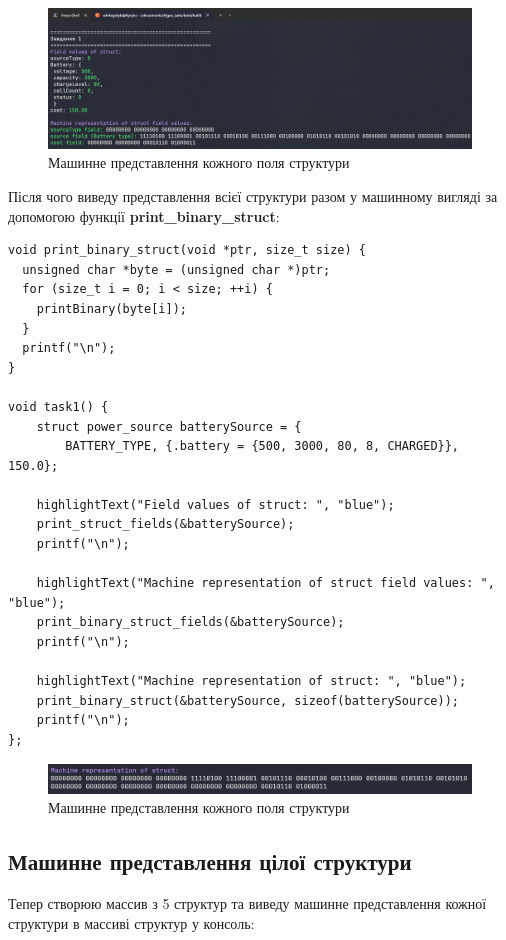\begin{figure}[h!]
    \centering
    \includegraphics[width=18cm]{reports/algos/lab4/assets/3.png}
    \caption{Машинне представлення кожного поля структури}
\end{figure}

Після чого виведу представлення всієї структури разом у машинному вигляді за допомогою функції \textbf{print\_binary\_struct}:

\begin{lstlisting}[style=customc]
void print_binary_struct(void *ptr, size_t size) {
  unsigned char *byte = (unsigned char *)ptr;
  for (size_t i = 0; i < size; ++i) {
    printBinary(byte[i]);
  }
  printf("\n");
}

void task1() {
    struct power_source batterySource = {
        BATTERY_TYPE, {.battery = {500, 3000, 80, 8, CHARGED}}, 150.0};

    highlightText("Field values of struct: ", "blue");
    print_struct_fields(&batterySource);
    printf("\n");

    highlightText("Machine representation of struct field values: ", "blue");
    print_binary_struct_fields(&batterySource);
    printf("\n");

    highlightText("Machine representation of struct: ", "blue");
    print_binary_struct(&batterySource, sizeof(batterySource));
    printf("\n");
};
\end{lstlisting}

\begin{figure}[h!]
    \centering
    \includegraphics[width=18cm]{reports/algos/lab4/assets/4.png}
    \caption{Машинне представлення кожного поля структури}
\end{figure}

\subsection{Машинне представлення цілої структури}
Тепер створюю массив з 5 структур та виведу машинне представлення кожної структури в массиві структур у консоль:

